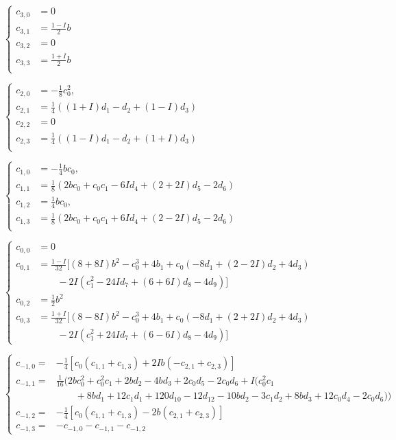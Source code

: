 \documentclass[11pt]{article}
\theoremstyle{definition}
\theoremstyle{plain}
\numberwithin{equation}{section}
\begin{document}
$
\left\{\begin{aligned}
c_{3,0}&=0\\
c_{3,1}&=\frac{1-I}{2} b\\
c_{3,2}&=0 \\
c_{3,3}&=\frac{1+I}{2} b \\ 
\end{aligned}
\right.
$

$
\left\{\begin{aligned}
c_{2,0}&=-\frac{1}{8} c_0^2,
\\
c_{2,1}&=\frac{1}{4}\left((1+I) d_1-d_2+(1-I) d_3\right) \\
c_{2,2}&=0 \\
c_{2,3}&=\frac{1}{4}\left((1-I) d_1-d_2+(1+I) d_3\right) \\ 
\end{aligned}
\right.
$

$
\left\{\begin{aligned}
c_{1,0}&=-\frac{1}{4} b c_0,\\
c_{1,1}&=\frac{1}{8}\left(2 b c_0+c_0 c_1-6 I d_4+(2+2 I) d_5-2 d_6\right) \\
c_{1,2}&=\frac{1}{4} b c_0, \\
c_{1,3}&=\frac{1}{8}\left(2 b c_0+c_0 c_1+6 I d_4+(2-2 I) d_5-2 d_6\right) \\
\end{aligned}
\right.
$

$
\left\{\begin{aligned}
c_{0,0}&=0\\
c_{0,1}&=\frac{1-I}{32}[(8+8 I) b^2-c_0^3+4 b_1 +c_0(-8 d_1+(2-2 I) d_2+4 d_3)\\
&\qquad -2 I\left(c_1^2-24 I d_7+(6+6 I) d_8-4 d_9\right)] \\
c_{0,2}&=\frac{1}{2} b^2 \\
c_{0,3}&=\frac{1+I}{32}[(8-8 I) b^2-c_0^3+4 b_1 
+c_0(-8 d_1+(2+2 I) d_2+4 d_3)\\
&\qquad-2 I(c_1^2+24 I d_7+(6-6 I) d_8-4 d_9)]
\end{aligned}
\right.
$

$
\left\{\begin{aligned}
c_{-1,0}=&-\frac{1}{4}[c_{0}(c_{1,1}+c_{1,3})+2Ib(-c_{2,1}+c_{2,3})]
\\c_{-1, 1} =& 
\frac{1}{16}(2 b c_0^2 + c_0^2 c_1 + 2 b d_2 - 4 b d_3 + 2 c_0 d_5 - 2 c_0 d_6 + 
I (c_0^2 c_1 
\\&\qquad + 8 b d_1 + 12 c_1 d_1 + 120 d_10 - 12 d_12 - 10 b d_2 - 
3 c_1 d_2 + 8 b d_3 + 12 c_0 d_4 - 2 c_0 d_6))
\\c_{-1,2}=&-\frac{1}{4}[c_{0}(c_{1,1}+c_{1,3})-2b(c_{2,1}+c_{2,3})]
\\c_{-1,3} =& -c_{-1,0} - c_{-1,1} - c_{-1,2}
\end{aligned}\right.
$
\end{document}
